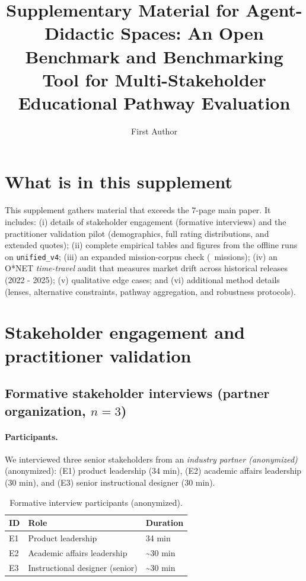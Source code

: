 \documentclass[sigconf,review]{acmart}
\title{Supplementary Material for Agent-Didactic Spaces: An Open Benchmark and Benchmarking Tool for Multi-Stakeholder Educational Pathway Evaluation}
\author{First Author}
\affiliation{%
  \institution{Institution}
  \city{City}
  \country{Country}
}
\newcommand{\IndustryPartner}{\textit{industry partner (anonymized)}}
\begin{document}
\maketitle

\renewcommand{\thetable}{S\arabic{table}}
\renewcommand{\thefigure}{S\arabic{figure}}
\setcounter{table}{0}
\setcounter{figure}{0}


\section{What is in this supplement}
This supplement gathers material that exceeds the 7-page main paper. It includes:
(i) details of stakeholder engagement (formative interviews) and the practitioner validation pilot (demographics, full rating distributions, and extended quotes);
(ii) complete empirical tables and figures from the offline runs on \texttt{unified\_v4};
(iii) an expanded mission-corpus check (\NumMissionsExpanded\ missions);
(iv) an O*NET \emph{time-travel} audit that measures market drift across historical releases (2022 - 2025);
(v) qualitative edge cases; and
(vi) additional method details (lenses, alternative constraints, pathway aggregation, and robustness protocols).


\section{Stakeholder engagement and practitioner validation}
\label{sec:supp-stakeholder}

\subsection{Formative stakeholder interviews (partner organization, $n{=}3$)}
\paragraph{Participants.} We interviewed three senior stakeholders from an \IndustryPartner (anonymized):
(E1) product leadership (34 min),
(E2) academic affairs leadership (30 min), and
(E3) senior instructional designer (30 min).

\begin{table}[h]
\centering
\small
\caption{Formative interview participants (anonymized).}
\label{tab:expert-participants}
\begin{tabular}{@{}lll@{}}
\toprule
ID & Role & Duration\\
\midrule
E1 & Product leadership & 34 min\\
E2 & Academic affairs leadership & \textasciitilde 30 min\\
E3 & Instructional designer (senior) & \textasciitilde 30 min\\
\bottomrule
\end{tabular}
\end{table}
\end{document}
